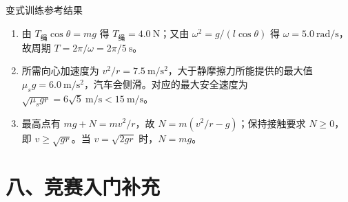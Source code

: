 \begin{learningbox}{变式训练参考结果}
\begin{enumerate}[itemsep=0.45em,topsep=0.3em,parsep=0pt]
  \item 由 $T_{\text{绳}}\cos\theta=mg$ 得
  $T_{\text{绳}}=4.0\ \mathrm N$；又由
  $\omega^2=g/(l\cos\theta)$ 得 $\omega=5.0\ \mathrm{rad/s}$，故周期
  $T=2\pi/\omega=2\pi/5\ \mathrm s$。
  \item 所需向心加速度为 $v^2/r=7.5\ \mathrm{m/s^2}$，大于静摩擦力所能提供的最大值
  $\mu_sg=6.0\ \mathrm{m/s^2}$，汽车会侧滑。对应的最大安全速度为
  $\sqrt{\mu_sgr}=6\sqrt5\ \mathrm{m/s}<15\ \mathrm{m/s}$。
  \item 最高点有 $mg+N=mv^2/r$，故
  $N=m(v^2/r-g)$；保持接触要求 $N\geqslant0$，即
  $v\geqslant\sqrt{gr}$。当 $v=\sqrt{2gr}$ 时，$N=mg$。
\end{enumerate}
\end{learningbox}

\section*{八、竞赛入门补充}

